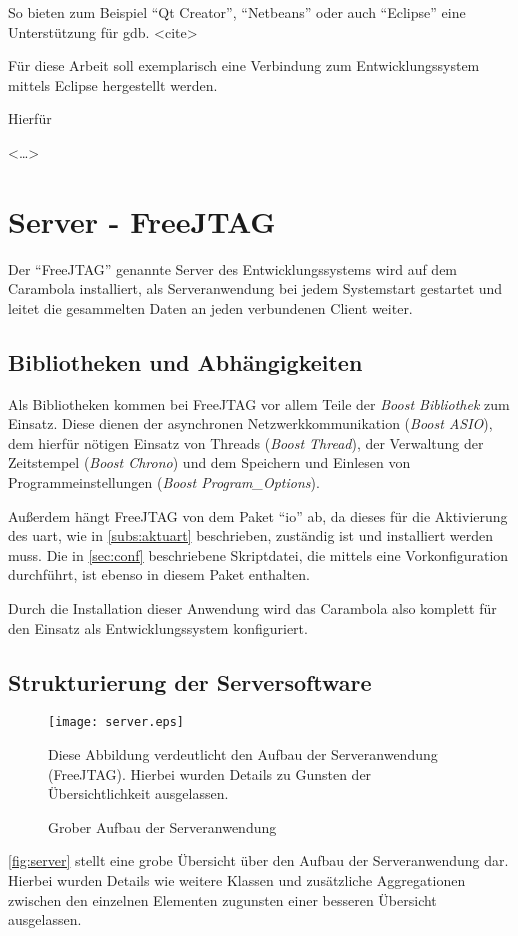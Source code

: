 So bieten zum Beispiel "`Qt Creator"', "`Netbeans"' oder auch "`Eclipse"' eine
Unterstützung für gdb. <cite>

Für diese Arbeit soll exemplarisch eine Verbindung zum Entwicklungssystem
mittels Eclipse hergestellt werden.

Hierfür

<\ldots>
\section{Server - FreeJTAG}
Der "`FreeJTAG"' genannte Server des Entwicklungssystems wird auf dem Carambola
installiert, als Serveranwendung bei jedem Systemstart gestartet und leitet die
gesammelten Daten an jeden verbundenen Client weiter.


\subsection{Bibliotheken und Abhängigkeiten}
Als Bibliotheken kommen bei FreeJTAG vor allem Teile der \emph{Boost Bibliothek}
zum Einsatz. Diese dienen der asynchronen Netzwerkkommunikation (\emph{Boost
ASIO}), dem hierfür nötigen Einsatz von Threads (\emph{Boost Thread}), der
Verwaltung der Zeitstempel (\emph{Boost Chrono}) und dem Speichern und
Einlesen von Programmeinstellungen (\emph{Boost Program\_Options}).

Außerdem hängt FreeJTAG von dem Paket "`io"' ab, da dieses für die Aktivierung
des \gls{uart}, wie in \autoref{subs:aktuart} beschrieben, zuständig ist und
installiert werden muss. Die in \autoref{sec:conf} beschriebene Skriptdatei,
die mittels  eine Vorkonfiguration durchführt, ist
ebenso in diesem Paket enthalten.

Durch die Installation dieser Anwendung wird das Carambola also komplett für den
Einsatz als Entwicklungssystem konfiguriert.

\subsection{Strukturierung der Serversoftware}
\begin{figure}[!ht]
\centering
\texttt{[image: server.eps]}
\caption{Grober Aufbau der Serveranwendung}{Diese Abbildung verdeutlicht den
Aufbau der Serveranwendung (FreeJTAG). Hierbei wurden Details zu Gunsten der
Übersichtlichkeit ausgelassen.}
\label{fig:server}
\end{figure}
\autoref{fig:server} stellt eine grobe Übersicht über den Aufbau der
Serveranwendung dar. Hierbei wurden Details wie weitere Klassen und
zusätzliche Aggregationen zwischen den einzelnen Elementen zugunsten einer
besseren Übersicht ausgelassen.

